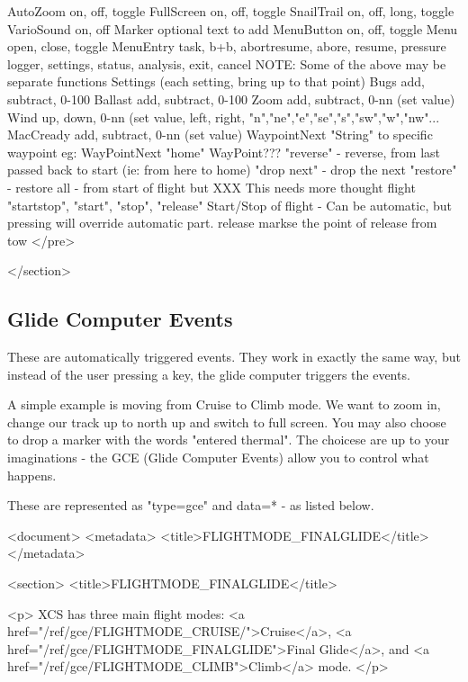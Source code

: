 				AutoZoom		on, off, toggle 
				FullScreen		on, off, toggle
				SnailTrail 		on, off, long, toggle
				VarioSound 		on, off
				Marker 			optional text to add
				MenuButton 		on, off, toggle
				Menu			open, close, toggle
				MenuEntry		task, b+b, abortresume, abore, resume, pressure
				logger, settings, status, analysis, exit, cancel
				NOTE: Some of the above may be separate functions
				Settings		(each setting, bring up to that point)
				Bugs			add, subtract, 0-100%
				Ballast			add, subtract, 0-100%
				Zoom			add, subtract, 0-nn (set value)
				Wind			up, down, 0-nn (set value, left, right, "n","ne","e","se","s","sw","w","nw"...
				MacCready		add, subtract, 0-nn (set value)
				WaypointNext		"String" to specific waypoint
				eg: WayPointNext "home"
				WayPoint???		"reverse" - reverse, from last passed back to start (ie: from here to home)
				"drop next" - drop the next
				"restore" - restore all - from start of flight but 
				XXX This needs more thought
				flight 			"startstop", "start", "stop", "release"
				Start/Stop of flight - Can be automatic, but pressing will override
				automatic part.
				release 		markse the point of release from tow
</pre>

			</section>


\subsection{Glide Computer Events}

These are automatically triggered events. They work in exactly the
same way, but instead of the user pressing a key, the glide computer
triggers the events.

A simple example is moving from Cruise to Climb mode. We want to zoom
in, change our track up to north up and switch to full screen. You may
also choose to drop a marker with the words "entered thermal". The
choicese are up to your imaginations - the GCE (Glide Computer Events)
allow you to control what happens.

These are represented as "type=gce" and data=* - as listed below.


<document>
        <metadata>
                <title>FLIGHTMODE_FINALGLIDE</title>
        </metadata>

<section>
                <title>FLIGHTMODE_FINALGLIDE</title>

<p>
XCS has three main flight modes: <a
href="/ref/gce/FLIGHTMODE_CRUISE/">Cruise</a>, <a
href="/ref/gce/FLIGHTMODE_FINALGLIDE">Final Glide</a>, and <a
href="/ref/gce/FLIGHTMODE_CLIMB">Climb</a> mode.
</p>

